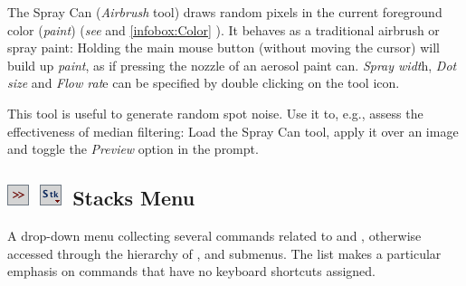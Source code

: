 The Spray
Can (\emph{Airbrush} tool) draws random pixels in the current foreground
color (\emph{paint}) (\emph{see} 
and \ref{infobox:Color} ). It behaves as
a traditional airbrush or spray paint: Holding the main mouse button
(without moving the cursor) will build up \emph{paint}, as if pressing
the nozzle of an aerosol paint can.\emph{ Spray widt}h,\emph{ Dot
size} and \emph{Flow rat}e can be specified by double clicking on
the tool icon.

This tool is useful to generate random spot noise. Use it to, e.g.,
assess the effectiveness of median filtering: Load the Spray Can tool,
apply it over an image and toggle the \emph{Preview} option in the
prompt. 




\subsection[Stacks Menu]{\noindent \textsf{\protect\includegraphics[bb=0bp 5bp 20bp 20bp,scale=0.6]{images/tools/Switcher}}~\textsf{\protect\includegraphics[bb=0bp 5bp 20bp 20bp,scale=0.6]{images/tools/StacksMenu}}~Stacks
Menu\label{sub:StacksMenu}\feature{}}

A drop-down menu collecting several commands related to 
and , otherwise accessed through the
hierarchy of ,
 and submenus.
The list makes a particular emphasis on commands that have no keyboard
shortcuts assigned.



